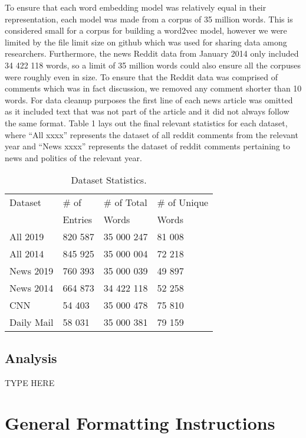 \documentclass[10pt,letterpaper]{article}
\begin{document}
To ensure that each word embedding model was relatively equal in their representation, each model was made from a corpus of 35 million words. This is considered small for a corpus for building a word2vec model, however we were limited by the file limit size on github which was used for sharing data among researchers. Furthermore, the news Reddit data from January 2014 only included 34 422 118 words, so a limit of 35 million words could also ensure all the corpuses were roughly even in size. To ensure that the Reddit data was comprised of comments which was in fact discussion, we removed any comment shorter than 10 words. For data cleanup purposes the first line of each news article was omitted as it included text that was not part of the article and it did not always follow the same format. Table 1 lays out the final relevant statistics for each dataset, where “All xxxx” represents the dataset of all reddit comments from the relevant year and “News xxxx” represents the dataset of reddit comments pertaining to news and politics of the relevant year.

\begin{table}[H]
\begin{center} 
\caption{Dataset Statistics.} 
\label{dataset-stat} 
\vskip 0.12in
\begin{tabular}{llll} 
\hline
Dataset    & \# of    & \# of Total & \# of Unique \\
           &  Entries & Words       & Words        \\
\hline
All 2019   & 820 587  & 35 000 247  & 81 008       \\
All 2014   & 845 925  & 35 000 004  & 72 218       \\
News 2019  & 760 393  & 35 000 039  & 49 897       \\
News 2014  & 664 873  & 34 422 118  & 52 258       \\
CNN        & 54 403   & 35 000 478  & 75 810       \\
Daily Mail & 58 031   & 35 000 381  & 79 159       \\
\hline
\end{tabular} 
\end{center} 
\end{table}

\subsection{Analysis}

TYPE HERE

\section{General Formatting Instructions}
\end{document}
